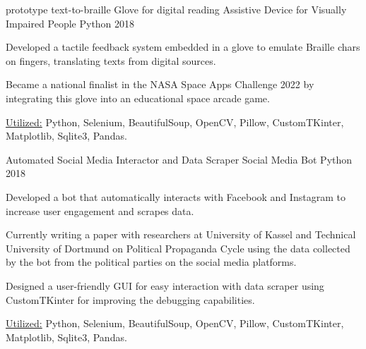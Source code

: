 \begin{cventries}
        
        \cventryprojects
        {prototype text-to-braille Glove for digital reading} %
        {Assistive Device for Visually Impaired People} %
        {Python} %
        {2018} %
        {
          \begin{cvitems} %
            \item { Developed a tactile feedback system embedded in a glove to emulate Braille chars on fingers, translating texts from digital sources.}
            \item { Became a national finalist in the NASA Space Apps Challenge 2022 by integrating this glove into an educational space arcade game.}
            \item {\underline{Utilized:} Python, Selenium, BeautifulSoup, OpenCV, Pillow, CustomTKinter, Matplotlib, Sqlite3, Pandas.}
          \end{cvitems}
          }
        \cventryprojects
        {Automated Social Media Interactor and Data Scraper} %
        {Social Media Bot} %
        {Python} %
        {2018} %
        {
          \begin{cvitems} %
            \item { Developed a bot that automatically interacts with Facebook and Instagram to increase user engagement and scrapes data.}
            \item { Currently writing a paper with researchers at University of Kassel and Technical University of Dortmund on Political Propaganda Cycle 
            using the data collected by the bot from the political parties on the social media platforms.}
            \item { Designed a user-friendly GUI for easy interaction with data scraper using CustomTKinter for improving the debugging capabilities.}
            \item {\underline{Utilized:} Python, Selenium, BeautifulSoup, OpenCV, Pillow, CustomTKinter, Matplotlib, Sqlite3, Pandas.}
          \end{cvitems}
          }
            

\end{cventries}

